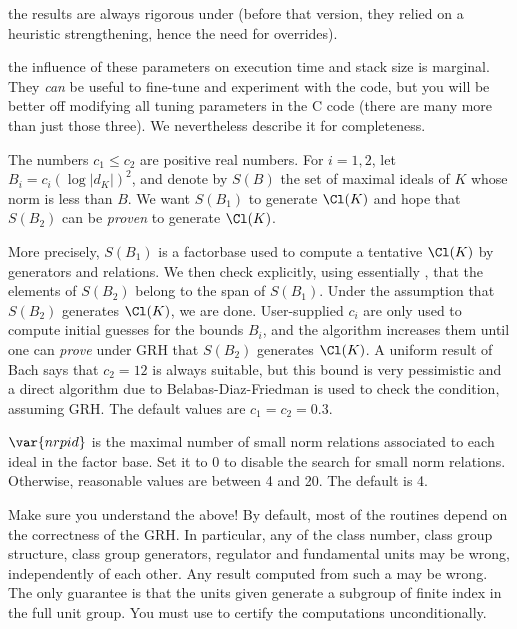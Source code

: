 \item the results are always rigorous under  (before that version,
they relied on a heuristic strengthening, hence the need for overrides).

\item the influence of these parameters on execution time and stack size is
marginal. They \emph{can} be useful to fine-tune and experiment with the
 code, but you will be better off modifying all tuning
parameters in the C code (there are many more than just those three).
We nevertheless describe it for completeness.

The numbers $c_1 \leq c_2$ are positive real numbers. For $i = 1,2$, let $B_i
= c_i(\log |d_K|)^2$, and denote by $S(B)$ the set of maximal ideals of $K$
whose norm is less than $B$. We want $S(B_1)$ to generate $\Cl(K)$ and hope
that $S(B_2)$ can be \emph{proven} to generate $\Cl(K)$.

More precisely, $S(B_1)$ is a factorbase used to compute a tentative
$\Cl(K)$ by generators and relations. We then check explicitly, using
essentially , that the elements of $S(B_2)$ belong to the
span of $S(B_1)$. Under the assumption that $S(B_2)$ generates $\Cl(K)$, we
are done. User-supplied $c_i$ are only used to compute initial guesses for
the bounds $B_i$, and the algorithm increases them until one can \emph{prove}
under GRH that $S(B_2)$ generates $\Cl(K)$. A uniform result of Bach says
that $c_2 = 12$ is always suitable, but this bound is very pessimistic and a
direct algorithm due to Belabas-Diaz-Friedman is used to check the condition,
assuming GRH. The default values are $c_1 = c_2 = 0.3$.

$\var{nrpid}$ is the maximal number of small norm relations associated to each
ideal in the factor base. Set it to $0$ to disable the search for small norm
relations. Otherwise, reasonable values are between 4 and 20. The default is
4.

 Make sure you understand the above! By default, most of
the  routines depend on the correctness of the GRH. In particular,
any of the class number, class group structure, class group generators,
regulator and fundamental units may be wrong, independently of each other.
Any result computed from such a  may be wrong. The only guarantee is
that the units given generate a subgroup of finite index in the full unit
group. You must use  to certify the computations
unconditionally.


